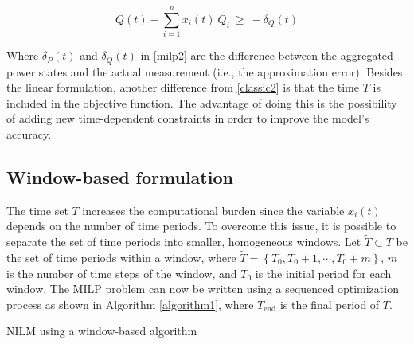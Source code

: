 \begin{equation} \label{eq7}
  Q(t) - \sum_{i = 1}^{n} x_i(t)\ Q_i \ \geq \ -\delta_Q(t)
\end{equation}

Where $\delta_P(t)$ and $\delta_Q(t)$ in \eqref{milp2} are the difference between the aggregated power states and the actual measurement (i.e., the approximation error). Besides the linear formulation, another difference from \eqref{classic2} is that the time $T$ is included in the objective function. The advantage of doing this is the possibility of adding new time-dependent constraints in order to improve the model's accuracy. 

\subsection{Window-based formulation}
The time set $T$ increases the computational burden since the variable $x_i(t)$ depends on the number of time periods. To overcome this issue, it is possible to separate the set of time periods into smaller, homogeneous windows. Let $\tilde{T} \subset T$ be the set of time periods within a window, where $\tilde{T} = \left\{ T_{0} , T_{0} + 1, \cdots , T_{0} + m \right\}$, $m$ is the number of time steps of the window, and $T_{0}$ is the initial period for each window. The MILP problem can now be written using a sequenced  optimization process as shown in Algorithm \ref{algorithm1}, where $T_{\text{end}}$ is the final period of $T$.

\begin{algorithm}\label{algorithm1}
\SetAlgoLined
 \caption{NILM using a window-based algorithm}
\end{algorithm}

